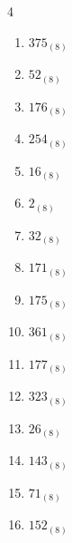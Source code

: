 \begin{multicols}{4}
\begin{enumerate}
  \item $375_{(8)}$

        \phantom{$=253$}

  \item $52_{(8)}$

        \phantom{$=42$}

  \item $176_{(8)}$

        \phantom{$=126$}

  \item $254_{(8)}$

        \phantom{$=172$}

  \item $16_{(8)}$

        \phantom{$=14$}

  \item $2_{(8)}$

        \phantom{$=2$}

  \item $32_{(8)}$

        \phantom{$=26$}

\columnbreak %

  \item $171_{(8)}$

        \phantom{$=121$}

  \item $175_{(8)}$

        \phantom{$=125$}

  \item $361_{(8)}$

        \phantom{$=241$}

  \item $177_{(8)}$

        \phantom{$=127$}

  \item $323_{(8)}$

        \phantom{$=211$}

  \item $26_{(8)}$

        \phantom{$=22$}

  \item $143_{(8)}$

        \phantom{$=99$}

  \item $71_{(8)}$

        \phantom{$=57$}

  \item $152_{(8)}$


\end{enumerate}
\end{multicols}
